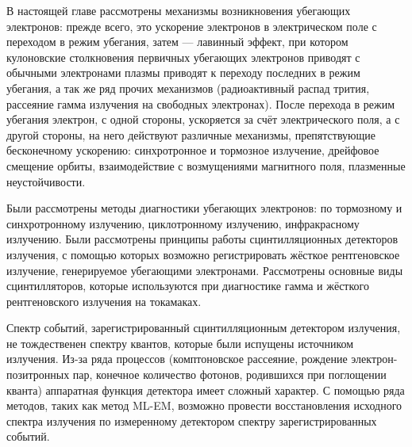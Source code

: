 В настоящей главе рассмотрены механизмы возникновения убегающих электронов: прежде всего, это ускорение электронов в электрическом поле с переходом в режим убегания, затем --- лавинный эффект, при котором кулоновские столкновения первичных убегающих электронов приводят с обычными электронами плазмы приводят к переходу последних в режим убегания, а так же ряд прочих механизмов (радиоактивный распад трития, рассеяние гамма излучения на свободных электронах). После перехода в режим убегания электрон, с одной стороны, ускоряется за счёт электрического поля, а с другой стороны, на него действуют различные механизмы, препятствующие бесконечному ускорению: синхротронное и тормозное излучение, дрейфовое смещение орбиты, взаимодействие с возмущениями магнитного поля, плазменные неустойчивости.

Были рассмотрены методы диагностики убегающих электронов: по тормозному и синхротронному излучению, циклотронному излучению, инфракрасному излучению. Были рассмотрены принципы работы сцинтилляционных детекторов излучения, с помощью которых возможно регистрировать жёсткое рентгеновское излучение, генерируемое убегающими электронами. Рассмотрены основные виды сцинтилляторов, которые используются при диагностике гамма и жёсткого рентгеновского излучения на токамаках.

Спектр событий, зарегистрированный сцинтилляционным детектором излучения, не тождественен спектру квантов, которые были испущены источником излучения. Из-за ряда процессов (комптоновское рассеяние, рождение электрон-позитронных пар, конечное количество фотонов, родившихся при поглощении кванта) аппаратная функция детектора имеет сложный характер. С помощью ряда методов, таких как метод ML-EM, возможно провести восстановления исходного спектра излучения по измеренному детектором спектру зарегистрированных событий.


\FloatBarrier
